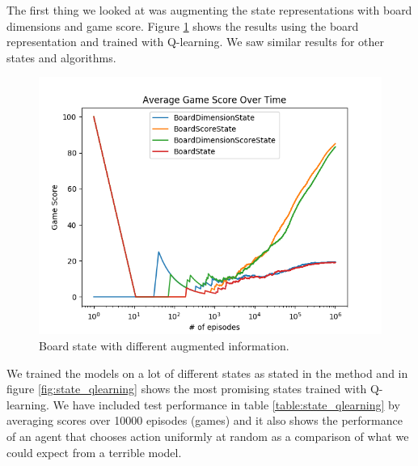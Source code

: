 \documentclass[result.tex]{subfiles}
\begin{document}
    The first thing we looked at was augmenting the state representations with board dimensions and game score. Figure \ref{fig:info_augmentation_board_state} shows the results using the board representation and trained with Q-learning. We saw similar results for other states and algorithms.

    \begin{figure}[ht]
        \centering
        \includegraphics[width=\linewidth]{../images/qlearning/info_augmentation/123/board_state_average_game_score_over_time.png}
        \caption{Board state with different augmented information.}
        \label{fig:info_augmentation_board_state}
    \end{figure}

    \newpage

    We trained the models on a lot of different states as stated in the method and in figure \ref{fig:state_qlearning} shows the most promising states trained with Q-learning. We have included test performance in table \ref{table:state_qlearning} by averaging scores over 10000 episodes (games) and it also shows the performance of an agent that chooses action uniformly at random as a comparison of what we could expect from a terrible model.
\end{document}
